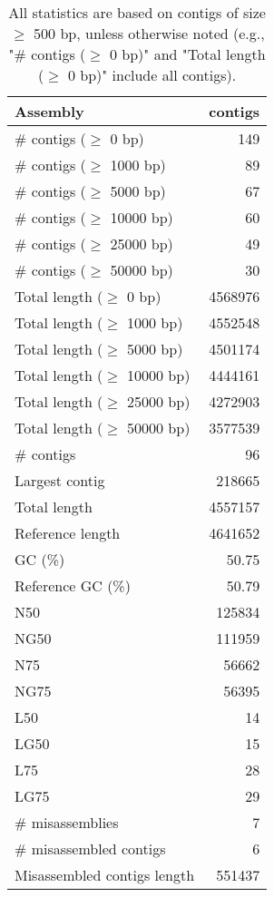 \documentclass[12pt,a4paper]{article}
\begin{document}
\begin{table}[ht]
\begin{center}
\caption{All statistics are based on contigs of size $\geq$ 500 bp, unless otherwise noted (e.g., "\# contigs ($\geq$ 0 bp)" and "Total length ($\geq$ 0 bp)" include all contigs).}
\begin{tabular}{|l*{1}{|r}|}
\hline
Assembly & contigs \\ \hline
\# contigs ($\geq$ 0 bp) & 149 \\ \hline
\# contigs ($\geq$ 1000 bp) & 89 \\ \hline
\# contigs ($\geq$ 5000 bp) & 67 \\ \hline
\# contigs ($\geq$ 10000 bp) & 60 \\ \hline
\# contigs ($\geq$ 25000 bp) & 49 \\ \hline
\# contigs ($\geq$ 50000 bp) & 30 \\ \hline
Total length ($\geq$ 0 bp) & 4568976 \\ \hline
Total length ($\geq$ 1000 bp) & 4552548 \\ \hline
Total length ($\geq$ 5000 bp) & 4501174 \\ \hline
Total length ($\geq$ 10000 bp) & 4444161 \\ \hline
Total length ($\geq$ 25000 bp) & 4272903 \\ \hline
Total length ($\geq$ 50000 bp) & 3577539 \\ \hline
\# contigs & 96 \\ \hline
Largest contig & 218665 \\ \hline
Total length & 4557157 \\ \hline
Reference length & 4641652 \\ \hline
GC (\%) & 50.75 \\ \hline
Reference GC (\%) & 50.79 \\ \hline
N50 & 125834 \\ \hline
NG50 & 111959 \\ \hline
N75 & 56662 \\ \hline
NG75 & 56395 \\ \hline
L50 & 14 \\ \hline
LG50 & 15 \\ \hline
L75 & 28 \\ \hline
LG75 & 29 \\ \hline
\# misassemblies & 7 \\ \hline
\# misassembled contigs & 6 \\ \hline
Misassembled contigs length & 551437 \\ \hline

\end{tabular}
\end{center}
\end{table}
\end{document}
